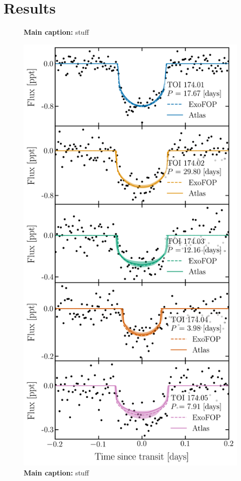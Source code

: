 \documentclass[floatfix,ApJL,twocolumn]{aastex631}
\begin{document}
\section{Results}\label{sec:results}



\begin{figure}
    \caption{\textbf{Main caption:} stuff }
    \label{fig:}
\end{figure}


\begin{figure}
    \includegraphics[width=0.9\linewidth]{paper/figures/toi_174_phase.png}
    \caption{\textbf{Main caption:} stuff }
    \label{fig:}
\end{figure}
\end{document}
